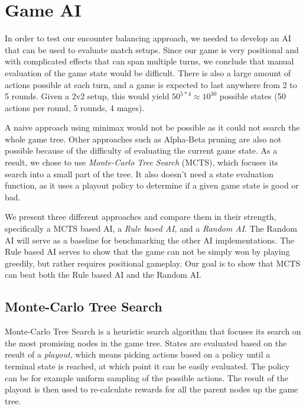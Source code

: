 \chapter{Game AI}
\label{chapter03}

In order to test our encounter balancing approach, we needed to develop an
AI that can be used to evaluate match setups. Since our game is very
positional and with complicated effects that can span multiple turns, we
conclude that manual evaluation of the game state would be difficult.
There is also a large amount of actions possible at each turn, and a game is expected
to last anywhere from 2 to 5 rounds. Given a 2v2 setup, this would yield
$50^{5*4} \approx 10^{30}$ possible states (50 actions per round, 5 rounds, 4 mages).

A naive approach using minimax \citep{ai-modern} would not be possible as it could not search the whole game tree.
Other approaches such as Alpha-Beta pruning \citep{ai-modern} are also not possible because of
the difficulty of evaluating the current game state. As a result, we chose to use \emph{Monte-Carlo Tree Search} (MCTS), which focuses its search into a small part of the tree. It also doesn't need a state evaluation function, as it uses a playout policy to determine if a given game state is good or bad.

We present three different approaches and compare them in their strength,
specifically a MCTS based AI, a \emph{Rule based AI}, and a \emph{Random AI}. The Random AI will serve
as a baseline for benchmarking the other AI implementations. The Rule based AI serves to show that the game
can not be simply won by playing greedily, but rather requires positional gameplay. Our goal is to show
that MCTS can beat both the Rule based AI and the Random AI.

\section{Monte-Carlo Tree Search}

Monte-Carlo Tree Search \citep{mcts-survey} is a heuristic search algorithm that focuses its search on the most
promising nodes in the game tree. States are evaluated based on the result of a \emph{playout}, which
means picking actions based on a policy until a terminal state is reached, at which point it can be easily
evaluated. The policy can be for example uniform sampling of the possible actions. The result
of the playout is then used to re-calculate rewards for all the parent nodes up the game tree.

